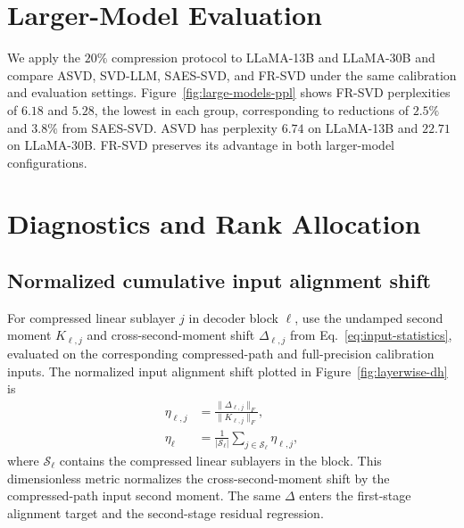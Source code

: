 \section{Larger-Model Evaluation}\label{app:full-results}\label{app:large-models}

We apply the $20\%$ compression protocol to LLaMA-13B and LLaMA-30B and compare ASVD, SVD-LLM, SAES-SVD, and FR-SVD under the same calibration and evaluation settings. Figure~\ref{fig:large-models-ppl} shows FR-SVD perplexities of $6.18$ and $5.28$, the lowest in each group, corresponding to reductions of $2.5\%$ and $3.8\%$ from SAES-SVD. ASVD has perplexity $6.74$ on LLaMA-13B and $22.71$ on LLaMA-30B. FR-SVD preserves its advantage in both larger-model configurations.



\section{Diagnostics and Rank Allocation}\label{app:diagnostics}

\subsection{Normalized cumulative input alignment shift}\label{app:input-shift}
For compressed linear sublayer $j$ in decoder block $\ell$, use the undamped second moment $K_{\ell,j}$ and cross-second-moment shift $\Delta_{\ell,j}$ from Eq.~\eqref{eq:input-statistics}, evaluated on the corresponding compressed-path and full-precision calibration inputs. The normalized input alignment shift plotted in Figure~\ref{fig:layerwise-dh} is
\begin{equation}
\begin{aligned}
\eta_{\ell,j}&=\frac{\|\Delta_{\ell,j}\|_F}{\|K_{\ell,j}\|_F},\\
\eta_\ell&=\frac1{|\mathcal S_\ell|}\sum_{j\in\mathcal S_\ell}\eta_{\ell,j},
\end{aligned}
\label{eq:app-input-shift}
\end{equation}
where $\mathcal S_\ell$ contains the compressed linear sublayers in the block. This dimensionless metric normalizes the cross-second-moment shift by the compressed-path input second moment. The same $\Delta$ enters the first-stage alignment target and the second-stage residual regression.

